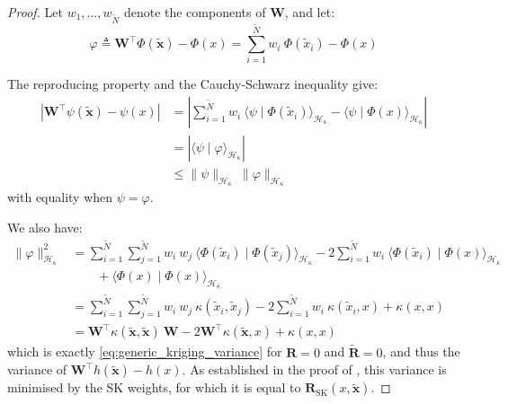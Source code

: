\begin{proof}
	Let $w_1,\dots,w_{\tilde{N}}$ denote the components of $\mathbf{W}$, and let:
	\begin{equation}
		\varphi\triangleq \mathbf{W}^\top\Phi(\tilde{\mathbf{x}})-\Phi(x)=\sum_{i=1}^{\tilde{N}}w_i\:\Phi(\tilde{x}_i)-\Phi(x)
	\end{equation}

	The reproducing property and the Cauchy-Schwarz inequality give:
	\begin{equation}
		\begin{aligned}
		\left|\mathbf{W}^\top\psi(\tilde{\mathbf{x}})-\psi(x)\right|&=\left|\sum_{i=1}^{\tilde{N}}w_i\:\langle\psi\mid\Phi(\tilde{x}_i)\rangle_{\mathcal{H}_\kappa}-\langle\psi\mid\Phi(x)\rangle_{\mathcal{H}_\kappa}\right|\\
		&=\left|\langle\psi\mid\varphi\rangle_{\mathcal{H}_\kappa}\right|\\
		&\leq\|\psi\|_{\mathcal{H}_\kappa}\:\|\varphi\|_{\mathcal{H}_\kappa}
		\end{aligned}
	\end{equation}
	with equality when $\psi=\varphi$.

	We also have:
	\begin{equation}
		\begin{aligned}
		\|\varphi\|_{\mathcal{H}_\kappa}^2&=\sum_{i=1}^{\tilde{N}}\sum_{j=1}^{\tilde{N}}w_i\:w_j\:\langle\Phi(\tilde{x}_i)\mid\Phi(\tilde{x}_j)\rangle_{\mathcal{H}_\kappa}-2\sum_{i=1}^{\tilde{N}}w_i\:\langle\Phi(\tilde{x}_i)\mid\Phi(x)\rangle_{\mathcal{H}_\kappa}\\
		&\qquad+\langle\Phi(x)\mid\Phi(x)\rangle_{\mathcal{H}_\kappa}\\
		&=\sum_{i=1}^{\tilde{N}}\sum_{j=1}^{\tilde{N}}w_i\:w_j\:\kappa(\tilde{x}_i,\tilde{x}_j)-2\sum_{i=1}^{\tilde{N}}w_i\:\kappa(\tilde{x}_i,x)+\kappa(x,x)\\
		&=\mathbf{W}^\top \kappa(\tilde{\mathbf{x}},\tilde{\mathbf{x}})\:\mathbf{W}-2\mathbf{W}^\top \kappa(\tilde{\mathbf{x}},x)+\kappa(x,x)
		\end{aligned}
	\end{equation}
	which is exactly \eqref{eq:generic_kriging_variance} for $\mathbf{R}=0$ and $\tilde{\mathbf{R}}=0$, and thus the variance of $\mathbf{W}^\top h(\tilde{\mathbf{x}})-h(x)$. As established in the proof of , this variance is minimised by the SK weights, for which it is equal to $\mathbf{R}_{\mathrm{SK}}(x,\tilde{\mathbf{x}})$.
\end{proof}

